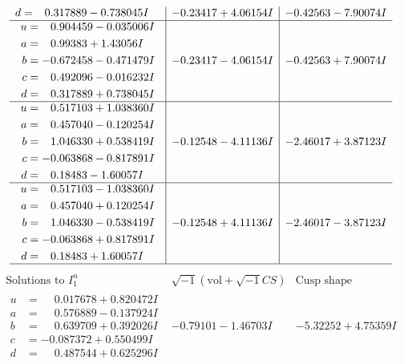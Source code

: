 \documentclass[1p]{elsarticle_modified}
\theoremstyle{definition}
\newcommand{\I}{\sqrt{-1}}
\begin{document}
$$\begin{array}{c|c|c}
\begin{aligned}
d &= \phantom{-}0.317889 - 0.738045 I\end{aligned}
 & -0.23417 + 4.06154 I & -0.42563 - 7.90074 I \\ \hline\begin{aligned}
u &= \phantom{-}0.904459 - 0.035006 I \\
a &= \phantom{-}0.99383 + 1.43056 I \\
b &= -0.672458 - 0.471479 I \\
c &= \phantom{-}0.492096 - 0.016232 I \\
d &= \phantom{-}0.317889 + 0.738045 I\end{aligned}
 & -0.23417 - 4.06154 I & -0.42563 + 7.90074 I \\ \hline\begin{aligned}
u &= \phantom{-}0.517103 + 1.038360 I \\
a &= \phantom{-}0.457040 - 0.120254 I \\
b &= \phantom{-}1.046330 + 0.538419 I \\
c &= -0.063868 - 0.817891 I \\
d &= \phantom{-}0.18483 - 1.60057 I\end{aligned}
 & -0.12548 - 4.11136 I & -2.46017 + 3.87123 I \\ \hline\begin{aligned}
u &= \phantom{-}0.517103 - 1.038360 I \\
a &= \phantom{-}0.457040 + 0.120254 I \\
b &= \phantom{-}1.046330 - 0.538419 I \\
c &= -0.063868 + 0.817891 I \\
d &= \phantom{-}0.18483 + 1.60057 I\end{aligned}
 & -0.12548 + 4.11136 I & -2.46017 - 3.87123 I\\
 \hline 
 \end{array}$$\newpage$$\begin{array}{c|c|c}  
\text{Solutions to }I^u_{1}& \I (\text{vol} + \sqrt{-1}CS) & \text{Cusp shape}\\
 \hline 
\begin{aligned}
u &= \phantom{-}0.017678 + 0.820472 I \\
a &= \phantom{-}0.576889 - 0.137924 I \\
b &= \phantom{-}0.639709 + 0.392026 I \\
c &= -0.087372 + 0.550499 I \\
d &= \phantom{-}0.487544 + 0.625296 I\end{aligned}
 & -0.79101 - 1.46703 I & -5.32252 + 4.75359 I \\ \hline\begin{aligned}

\end{aligned}
\end{array}$$
\end{document}
